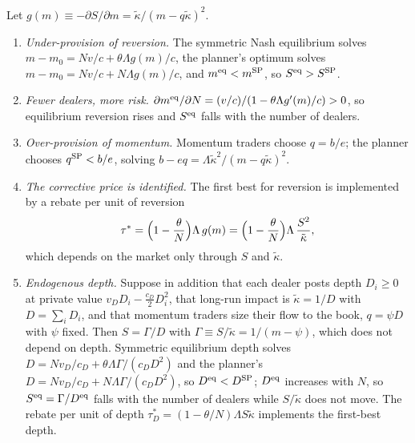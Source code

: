\begin{proposition}\label{p2:prop:equil}
Let $g(m)\equiv-\partial S/\partial m=\tilde\kappa/(m-q\tilde\kappa)^2$.
\begin{enumerate}[label=(\roman*)]
\item \emph{Under-provision of reversion.} The symmetric Nash equilibrium solves $m-m_0=N v/c+\theta\Lambda g(m)/c$, the planner's optimum solves $m-m_0=N v/c+N\Lambda g(m)/c$, and $m^{\rm eq}<m^{\rm SP}$, so $S^{\rm eq}>S^{\rm SP}$.
\item \emph{Fewer dealers, more risk.} $\partial m^{\rm eq}/\partial N=(v/c)/(1-\theta\Lambda g'(m)/c)>0$, so equilibrium reversion rises and $S^{\rm eq}$ falls with the number of dealers.
\item \emph{Over-provision of momentum.} Momentum traders choose $q=b/e$; the planner chooses $q^{\rm SP}<b/e$, solving $b-eq=\Lambda\tilde\kappa^2/(m-q\tilde\kappa)^2$.
\item \emph{The corrective price is identified.} The first best for reversion is implemented by a rebate per unit of reversion
\[
\tau^*=\Bigl(1-\frac\theta N\Bigr)\Lambda\,g(m)=\Bigl(1-\frac\theta N\Bigr)\Lambda\,\frac{S^2}{\tilde\kappa},
\]
which depends on the market only through $S$ and $\tilde\kappa$.
\item \emph{Endogenous depth.} Suppose in addition that each dealer posts depth $D_i\ge0$ at private value $v_DD_i-\tfrac{c_D}2D_i^2$, that long-run impact is $\tilde\kappa=1/D$ with $D=\sum_iD_i$, and that momentum traders size their flow to the book, $q=\psi D$ with $\psi$ fixed. Then $S=\Gamma/D$ with $\Gamma\equiv S/\tilde\kappa=1/(m-\psi)$, which does not depend on depth. Symmetric equilibrium depth solves $D=Nv_D/c_D+\theta\Lambda\Gamma/(c_DD^2)$ and the planner's $D=Nv_D/c_D+N\Lambda\Gamma/(c_DD^2)$, so $D^{\rm eq}<D^{\rm SP}$; $D^{\rm eq}$ increases with $N$, so $S^{\rm eq}=\Gamma/D^{\rm eq}$ falls with the number of dealers while $S/\tilde\kappa$ does not move. The rebate per unit of depth $\tau_D^*=(1-\theta/N)\Lambda S\tilde\kappa$ implements the first-best depth.
\end{enumerate}
\end{proposition}

